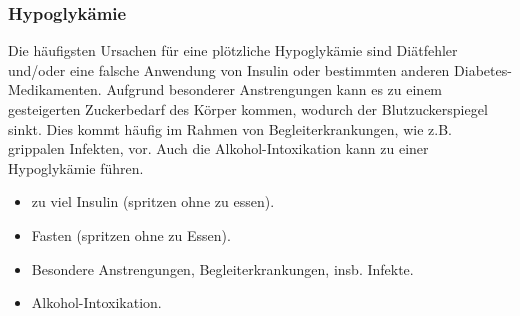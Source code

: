 \subsubsection{Hypoglykämie}
\label{topic:hypoglykaemie}


{
Die häufigsten Ursachen für eine plötzliche Hypoglykämie sind Diätfehler
und/oder eine falsche Anwendung von Insulin oder bestimmten anderen
Diabetes-Medikamenten. Aufgrund besonderer Anstrengungen kann es zu einem
gesteigerten Zuckerbedarf des Körper kommen, wodurch der Blutzuckerspiegel
sinkt. Dies kommt häufig im Rahmen von Begleiterkrankungen, wie z.B. grippalen
Infekten, vor. Auch die Alkohol-Intoxikation kann zu einer
Hypoglykämie führen\cite{LoefflerBiochemie7}. 
}{
\begin{itemize}
  \item zu viel Insulin (spritzen ohne zu essen).
  \item Fasten (spritzen ohne zu Essen).
  \item Besondere Anstrengungen, Begleiterkrankungen,
  insb. Infekte.
  \item Alkohol-Intoxikation.
\end{itemize}
}{}{}{}






